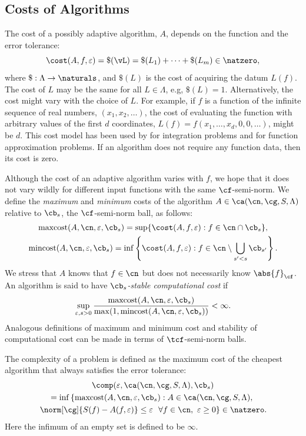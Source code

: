 \documentclass[]{elsarticle}
\DeclareMathOperator{\maxcost}{maxcost}
\DeclareMathOperator{\mincost}{mincost}
\theoremstyle{definition}
\theoremstyle{remark}
\newcommand{\Fnorm}[1]{\abs{#1}_{\cf}}
\begin{document}
\subsection{Costs of Algorithms} \label{AlgoCostsec}

The cost of a possibly adaptive algorithm, $A$, depends on the function and the error tolerance: 
\[
\cost(A,f,\varepsilon) = \$(\vL) = \$(L_1) + \cdots +\$(L_m) \in \natzero,
\]
where $\$:\Lambda \to \naturals$, and $\$(L)$ is the cost of acquiring the datum $L(f)$. The cost of $L$ may be the same for all $L \in \Lambda$, e.g, $\$(L)=1$.  Alternatively, the cost might vary with the choice of $L$.  For example, if $f$ is a function of the infinite sequence of real numbers, $(x_1, x_2, \ldots)$, the cost of evaluating the function with arbitrary values of the first $d$ coordinates, $L(f)=f(x_1, \ldots, x_d, 0, 0, \ldots)$, might be $d$.  This cost model has been used by \cite{HicMGRitNiu09a,KuoEtal10a,NiuHic09a,NiuHic09b,PlaWas11a} for integration problems and \cite{Was13a,WasWoz11a,WasWoz11b} for function approximation problems.  If an algorithm does not require any function data, then its cost is zero.

Although the cost of an adaptive algorithm varies with $f$, we hope that it does not vary wildly for different input functions with the same $\cf$-semi-norm. We define the \emph{maximum} and \emph{minimum} costs of the algorithm $A\in \ca(\cn,\cg,S,\Lambda)$ relative to $\cb_{s}$, the $\cf$-semi-norm ball, as follows:
\begin{gather*}
\maxcost(A,\cn,\varepsilon,\cb_s)
= \sup \{ \cost(A,f,\varepsilon) : f \in \cn \cap \cb_{s} \}, \\ \mincost(A,\cn,\varepsilon,\cb_s)
= \inf \left \{ \cost(A,f,\varepsilon) : f \in \cn\setminus \bigcup_{s'<s}\cb_{s'} \right\} .
\end{gather*}
We stress that $A$ knows that $f \in \cn$ but does not necessarily know $\Fnorm{f}$.  An algorithm is said to have \emph{$\cb_{s}$-stable computational cost} if 
\begin{equation*}\label{coststabledef}
\sup_{\varepsilon, s > 0} \frac{\maxcost(A,\cn,\varepsilon,\cb_s)}{\max(1,\mincost(A,\cn,\varepsilon, \cb_s))} < \infty.
\end{equation*} 
Analogous definitions of maximum and minimum cost and stability of computational cost can be made in terms of $\tcf$-semi-norm balls.

The complexity of a problem is defined as the maximum cost of the cheapest algorithm that always satisfies the error tolerance:
\begin{multline*} \label{complexdef}
\comp(\varepsilon,\ca(\cn,\cg,S,\Lambda),\cb_s) \\
 = \inf\left\{\maxcost(A,\cn,\varepsilon,\cb_s) : A \in \ca(\cn,\cg,S,\Lambda), \right. \\
 \left . \norm[\cg]{S(f)-A(f,\varepsilon)} \le \varepsilon \ \ \forall f \in \cn, \ \varepsilon \ge 0 \right \} \in \natzero.
\end{multline*}
Here the infimum of an empty set is defined to be $\infty$.  
\end{document}
